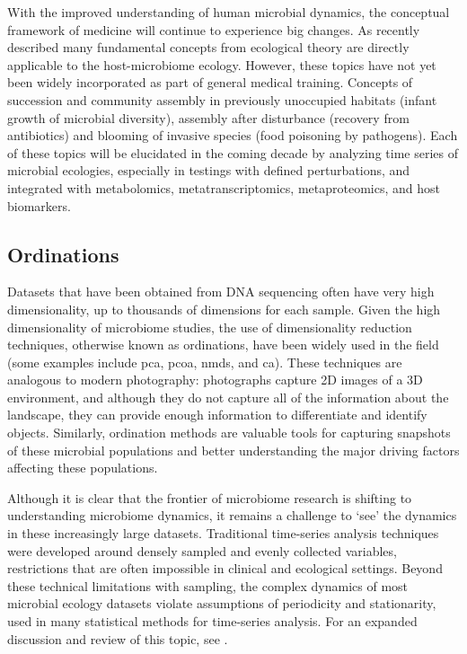 With the improved understanding of human microbial dynamics, the conceptual framework of medicine will continue to experience big changes. As recently described \cite{RN4020} many fundamental concepts from ecological theory are directly applicable to the host-microbiome ecology. However, these topics have not yet been widely incorporated as part of general medical training.  Concepts of succession and community assembly in previously unoccupied habitats (infant growth of microbial diversity), assembly after disturbance (recovery from antibiotics) and blooming of invasive species (food poisoning by pathogens).  Each of these topics will be elucidated in the coming decade by analyzing time series of microbial ecologies, especially in testings with defined perturbations, and integrated with metabolomics, metatranscriptomics, metaproteomics, and host biomarkers.

\subsection{Ordinations}
Datasets that have been obtained from DNA sequencing often have very high dimensionality, up to thousands of dimensions for each sample. Given the high dimensionality of  microbiome studies, the use of dimensionality reduction techniques, otherwise known as ordinations, have been widely used in the field (some examples include \gls{pca}, \gls{pcoa}, \gls{nmds}, and \gls{ca}). These techniques are analogous to modern photography: photographs capture 2D images of a 3D environment, and although they do not capture all of the information about the landscape, they can provide enough information to differentiate and identify objects.  Similarly, ordination methods are valuable tools for capturing snapshots of these microbial populations and better understanding the major driving factors affecting these populations. 

Although it is clear that the frontier of microbiome research is shifting to understanding microbiome dynamics, it remains a challenge to `see' the dynamics in these increasingly large datasets. Traditional time-series analysis techniques were developed around densely sampled and evenly collected variables, restrictions that are often impossible in clinical and ecological settings. Beyond these technical limitations with sampling, the complex dynamics of most microbial ecology datasets violate assumptions of periodicity and stationarity, used in many statistical methods for time-series analysis. For an expanded discussion and review of this topic, see \cite{RN4029}.

